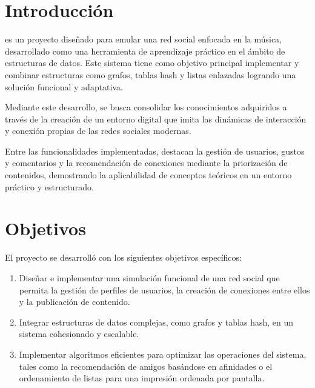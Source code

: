 \section{Introducción}
\loopweb es un proyecto diseñado para emular una red social enfocada en la música, desarrollado como una herramienta de aprendizaje práctico en el ámbito de estructuras de datos. Este sistema tiene como objetivo principal implementar y combinar estructuras como grafos, tablas hash y listas enlazadas logrando una solución funcional y adaptativa.

Mediante este desarrollo, se busca consolidar los conocimientos adquiridos a través de la creación de un entorno digital que imita las dinámicas de interacción y conexión propias de las redes sociales modernas.

Entre las funcionalidades implementadas, destacan la gestión de usuarios, gustos y comentarios y la recomendación de conexiones mediante la priorización de contenidos, demostrando la aplicabilidad de conceptos teóricos en un entorno práctico y estructurado.

\section{Objetivos}
El proyecto \loopweb se desarrolló con los siguientes objetivos específicos:

\begin{enumerate}
    \item Diseñar e implementar una simulación funcional de una red social que permita la gestión de perfiles de usuarios, la creación de conexiones entre ellos y la publicación de contenido.
    \item Integrar estructuras de datos complejas, como grafos y tablas hash, en un sistema cohesionado y escalable.
    \item Implementar algoritmos eficientes para optimizar las operaciones del sistema, tales como la recomendación de amigos basándose en afinidades o el ordenamiento de listas para una impresión ordenada por pantalla.
\end{enumerate}
